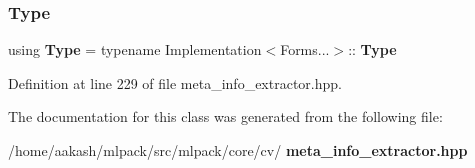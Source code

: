 \subsubsection{Type}
{\footnotesize\ttfamily using \textbf{ Type} =  typename Implementation$<$Forms...$>$\+::\textbf{ Type}}



Definition at line 229 of file meta\+\_\+info\+\_\+extractor.\+hpp.



The documentation for this class was generated from the following file\+:\begin{DoxyCompactItemize}
\item 
/home/aakash/mlpack/src/mlpack/core/cv/\textbf{ meta\+\_\+info\+\_\+extractor.\+hpp}\end{DoxyCompactItemize}
